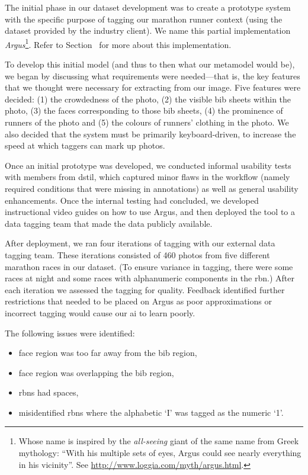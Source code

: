 The initial phase in our dataset development was to create a prototype system with the specific purpose of tagging our marathon runner context (using the dataset provided by the industry client). We name this partial implementation \textit{Argus}\footnote{Whose name is inspired by the \textit{all-seeing} giant of the same name from Greek mythology: ``With his multiple sets of eyes, Argus could see nearly everything in his vicinity''. See \url{http://www.loggia.com/myth/argus.html}.}. Refer to Section~ for more about this implementation. 

To develop this initial model (and thus to then what our metamodel would be), we began by discussing what requirements were needed---that is, the key features that we thought were necessary for extracting from our image. Five features were decided: (1) the crowdedness of the photo, (2) the visible bib sheets within the photo, (3) the faces corresponding to those bib sheets, (4) the prominence of runners of the photo and (5) the colours of runners' clothing in the photo. We also decided that the system must be primarily keyboard-driven, to increase the speed at which taggers can mark up photos.

Once an initial prototype was developed, we conducted informal usability tests with members from \gls{dstil}, which captured minor flaws in the workflow (namely required conditions that were missing in annotations) as well as general usability enhancements. Once the internal testing had concluded, we developed instructional video guides on how to use Argus, and then deployed the tool to a data tagging team that made the data publicly available.

After deployment, we ran four iterations of tagging with our external data tagging team. These iterations consisted of 460 photos from five different marathon races in our dataset. (To ensure variance in tagging, there were some races at night and some races with alphanumeric components in the \gls{rbn}.) After each iteration we assessed the tagging for quality. Feedback identified further restrictions that needed to be placed on Argus as poor approximations or incorrect tagging would cause our \gls{ai} to learn poorly. 

The following issues were identified:

\begin{itemize}
  \item face region was too far away from the bib region,
  \item face region was overlapping the bib region,
  \item \glspl{rbn} had spaces,
  \item misidentified \glspl{rbn} where the alphabetic `I' was tagged as the numeric `1'.
\end{itemize}


